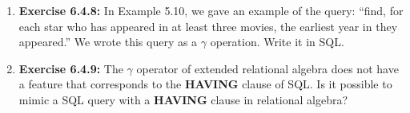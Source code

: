 \documentclass[12pt]{article}
\begin{document}
\begin{enumerate}[1.]
    \item \textbf{Exercise 6.4.8:} In Example 5.10, we gave an example of the query:
    ``find, for each star who has appeared in at least three movies, the earliest year
    in they appeared.'' We wrote this query as a $\gamma$ operation. Write it in SQL.

    \item \textbf{Exercise 6.4.9:} The $\gamma$ operator of extended relational algebra
    does not have a feature that corresponds to the \textbf{HAVING} clause of SQL.
    Is it possible to mimic a SQL query with a \textbf{HAVING} clause in relational
    algebra?
\end{enumerate}
\end{document}
